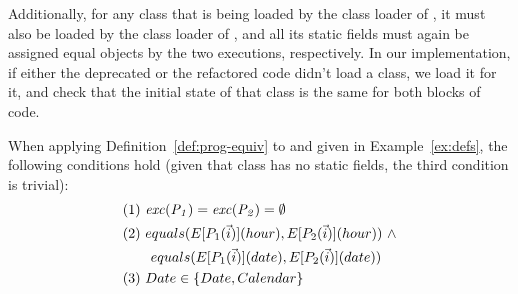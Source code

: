 \documentclass[sigconf,review,anonymous]{acmart}
\begin{document}

Additionally, for any class that
is being loaded by the class loader of , it must also be loaded by the class loader of , and
all its static fields must again be assigned equal objects by the
two executions, respectively. 
In our implementation, if either the deprecated or the refactored code didn't load a class, we load it for it,
and check that the initial state of that class is the same for both blocks of code.




\begin{example}\label{ex:equiv}
  When applying Definition~\ref{def:prog-equiv} to  and  given in Example~\ref{ex:defs},
  the following conditions hold (given that class  has no static fields, the third condition is trivial):
\[
\begin{aligned}
      & (1)~ \var{exc(P_1)}=\var{exc(P_2)} =\emptyset\\
      & (2)~ equals(E[P_1(\vec{i})](hour), E[P_2(\vec{i})](hour)) ~ \wedge\\ %
      & \qquad equals(E[P_1(\vec{i})](date), E[P_2(\vec{i})](date))\\
& (3)~  Date \in \{Date, Calendar\}
    \end{aligned}
    \]

 
    
\end{example}
\end{document}

